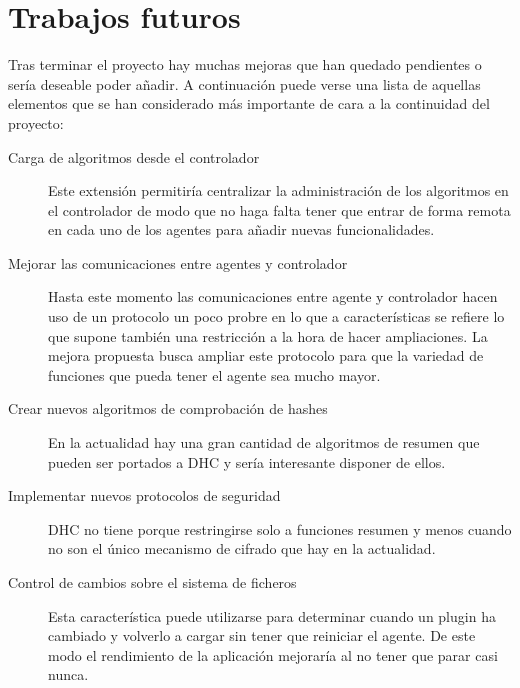 \chapter{Trabajos futuros}\label{cap6}

Tras terminar el proyecto hay muchas mejoras que han quedado pendientes o sería deseable poder añadir. A continuación puede verse una lista de aquellas elementos que se han considerado más importante de cara a la continuidad del proyecto:

\begin{description}
	\item[Carga de algoritmos desde el controlador] Este extensión permitiría centralizar la administración de los algoritmos en el controlador de modo que no haga falta tener que entrar de forma remota en cada uno de los agentes para añadir nuevas funcionalidades.

	\item[Mejorar las comunicaciones entre agentes y controlador] Hasta este momento las comunicaciones entre agente y controlador hacen uso de un protocolo un poco probre en lo que a características se refiere lo que supone también una restricción a la hora de hacer ampliaciones. La mejora propuesta busca ampliar este protocolo para que la variedad de funciones que pueda tener el agente sea mucho mayor.

	\item[Crear nuevos algoritmos de comprobación de hashes] En la actualidad hay una gran cantidad de algoritmos de resumen que pueden ser portados a  DHC y sería interesante disponer de ellos.
	
	\item[Implementar nuevos protocolos de seguridad] DHC no tiene porque restringirse solo a funciones resumen y menos cuando no son el único mecanismo de cifrado que hay en la actualidad.

	\item[Control de cambios sobre el sistema de ficheros] Esta característica puede utilizarse para determinar cuando un plugin ha cambiado y volverlo a cargar sin tener que reiniciar el agente. De este modo el rendimiento de la aplicación mejoraría al no tener que parar casi nunca.
\end{description}
